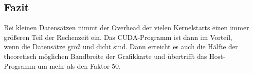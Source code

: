 \documentclass[ngerman]{scrartcl}
\begin{document}



\subsection{Fazit}
Bei kleinen Datensätzen nimmt der Overhead der vielen Kernelstarts einen immer größeren Teil der Rechenzeit ein.
Das CUDA-Programm ist dann im Vorteil, wenn die Datensätze groß und dicht sind. 
Dann erreicht es auch die Hälfte der theoretisch möglichen Bandbreite der Grafikkarte und übertrifft das Host-Programm um mehr als den Faktor 50.
\clearpage

\nocite{introductiontosvm}
\nocite{diplomarbeit}
\nocite{libsvm}
\nocite{cudaprogrammingguide}

\renewcommand{\refname}{Literaturverzeichnis}
{}

\end{document}
